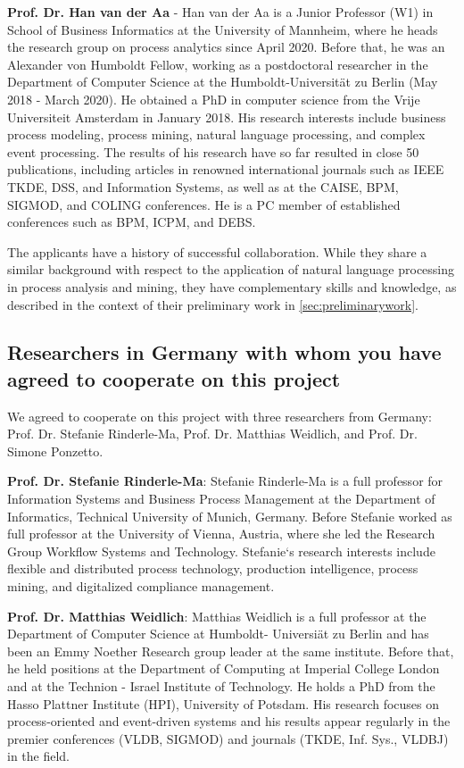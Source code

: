 \textbf{Prof. Dr. Han van der Aa} - Han van der Aa is a Junior Professor (W1) in School of Business Informatics at the University of Mannheim, where he heads the research group on process analytics since April 2020. Before that, he was an Alexander von Humboldt Fellow, working as a postdoctoral researcher in the Department of Computer Science at the Humboldt-Universität zu Berlin (May 2018 - March 2020). He obtained a PhD in computer science from the Vrije Universiteit Amsterdam in January 2018. His research interests include business process modeling, process mining, natural language processing, and complex event processing. 
The results of his research have so far resulted in close 50 publications, including articles in 
renowned international journals such as IEEE TKDE, DSS, and Information Systems, as well as at the CAISE, BPM, SIGMOD, and COLING conferences.
He is a PC member of established conferences such as BPM, ICPM, and DEBS.


The applicants have a history of successful collaboration. While they share a similar background with respect to the application of natural language processing in process analysis and mining, they  have complementary skills and knowledge, as described in the context of their preliminary work in \autoref{sec:preliminarywork}.

\subsection{Researchers in Germany with whom you have agreed to cooperate on this project}
\label{sec:collab:germany}

We agreed to cooperate on this project with three researchers from Germany: Prof. Dr. Stefanie Rinderle-Ma, Prof. Dr. Matthias Weidlich, and Prof. Dr. Simone Ponzetto. 

\textbf{Prof. Dr. Stefanie Rinderle-Ma}: Stefanie Rinderle-Ma is a full professor for Information Systems and Business Process Management at the Department of Informatics, Technical University of Munich, Germany. Before Stefanie worked as full professor at the University of Vienna, Austria, where she led the Research Group Workflow Systems and Technology. Stefanie‘s research interests include flexible and distributed process technology, production intelligence, process mining, and digitalized compliance management.
 
\textbf{Prof. Dr. Matthias Weidlich}: Matthias Weidlich is a full professor at the Department of Computer Science at Humboldt- Universi\"at zu Berlin and has been an Emmy Noether Research group leader at the same institute. Before that, he held positions at the Department of Computing at Imperial College London and at the Technion - Israel Institute of Technology. He holds a PhD from the Hasso Plattner Institute (HPI), University of Potsdam. His research focuses on process-oriented and event-driven systems and his results appear regularly in the premier conferences (VLDB, SIGMOD) and journals (TKDE, Inf. Sys., VLDBJ) in the field.

